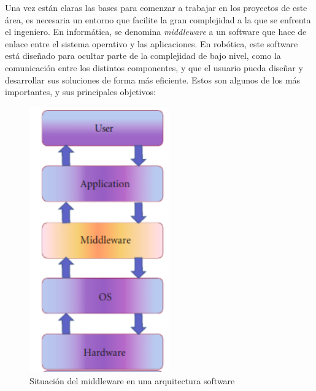 \documentclass[12pt,spanish,chapterprefix, numbers=noenddot]{book}
\numberwithin{equation}{section}
\numberwithin{figure}{section}
\begin{document}
Una vez están claras las bases para comenzar a trabajar en los proyectos de este área, es necesaria un entorno que facilite la gran complejidad a la que se enfrenta el ingeniero. En informática, se denomina \textit{middleware} a un software que hace de enlace entre el sistema operativo y las aplicaciones. En robótica, este software está diseñado para ocultar parte de la complejidad de bajo nivel, como la comunicación entre los distintos componentes, y que el usuario pueda diseñar y desarrollar sus soluciones de forma más eficiente. Estos son algunos de los más importantes, y sus principales objetivos: 
\begin{figure}[hbt!]
\centering
\includegraphics[width=6cm]{Figs/layersMiddleware.png}
\par
\caption{\label{fig:middleware}Situación del middleware en una arquitectura software}
\end{figure}
\end{document}
